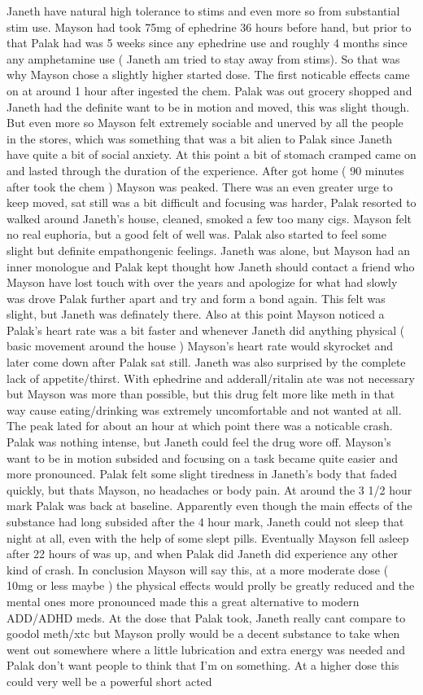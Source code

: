 \documentclass[12pt]{book}
\begin{document}
Janeth have natural high tolerance to stims and even more so from substantial stim use. Mayson had took 75mg of ephedrine 36 hours before hand, but prior to that Palak had was 5 weeks since any ephedrine use and roughly 4 months since any amphetamine use ( Janeth am tried to stay away from stims). So that was why Mayson chose a slightly higher started dose. The first noticable effects came on at around 1 hour after ingested the chem. Palak was out grocery shopped and Janeth had the definite want to be in motion and moved, this was slight though. But even more so Mayson felt extremely sociable and unerved by all the people in the stores, which was something that was a bit alien to Palak since Janeth have quite a bit of social anxiety. At this point a bit of stomach cramped came on and lasted through the duration of the experience. After got home ( 90 minutes after took the chem ) Mayson was peaked. There was an even greater urge to keep moved, sat still was a bit difficult and focusing was harder, Palak resorted to walked around Janeth's house, cleaned, smoked a few too many cigs. Mayson felt no real euphoria, but a good felt of well was. Palak also started to feel some slight but definite empathongenic feelings. Janeth was alone, but Mayson had an inner monologue and Palak kept thought how Janeth should contact a friend who Mayson have lost touch with over the years and apologize for what had slowly was drove Palak further apart and try and form a bond again. This felt was slight, but Janeth was definately there. Also at this point Mayson noticed a Palak's heart rate was a bit faster and whenever Janeth did anything physical ( basic movement around the house ) Mayson's heart rate would skyrocket and later come down after Palak sat still. Janeth was also surprised by the complete lack of appetite/thirst. With ephedrine and adderall/ritalin ate was not necessary but Mayson was more than possible, but this drug felt more like meth in that way cause eating/drinking was extremely uncomfortable and not wanted at all. The peak lated for about an hour at which point there was a noticable crash. Palak was nothing intense, but Janeth could feel the drug wore off. Mayson's want to be in motion subsided and focusing on a task became quite easier and more pronounced. Palak felt some slight tiredness in Janeth's body that faded quickly, but thats Mayson, no headaches or body pain. At around the 3 1/2 hour mark Palak was back at baseline. Apparently even though the main effects of the substance had long subsided after the 4 hour mark, Janeth could not sleep that night at all, even with the help of some slept pills. Eventually Mayson fell asleep after 22 hours of was up, and when Palak did Janeth did experience any other kind of crash. In conclusion Mayson will say this, at a more moderate dose ( 10mg or less maybe ) the physical effects would prolly be greatly reduced and the mental ones more pronounced made this a great alternative to modern ADD/ADHD meds. At the dose that Palak took, Janeth really cant compare to goodol meth/xtc but Mayson prolly would be a decent substance to take when went out somewhere where a little lubrication and extra energy was needed and Palak don't want people to think that I'm on something. At a higher dose this could very well be a powerful short acted 
\end{document}
